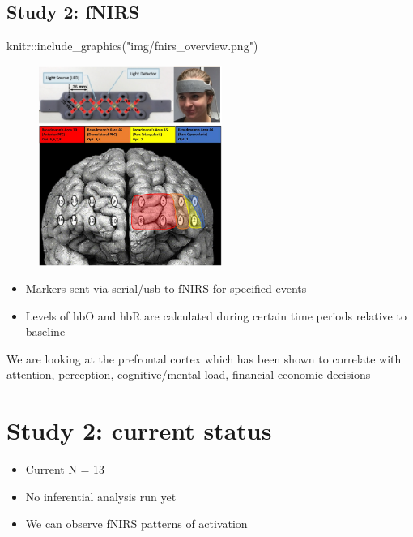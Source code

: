 \documentclass[
  letterpaper,
  DIV=11,
  numbers=noendperiod]{scrartcl}
\newenvironment{Shaded}{\begin{snugshade}}{\end{snugshade}}
\newcommand{\FunctionTok}[1]{\textcolor[rgb]{0.28,0.35,0.67}{#1}}
\newcommand{\NormalTok}[1]{\textcolor[rgb]{0.00,0.23,0.31}{#1}}
\newcommand{\SpecialCharTok}[1]{\textcolor[rgb]{0.37,0.37,0.37}{#1}}
\newcommand{\StringTok}[1]{\textcolor[rgb]{0.13,0.47,0.30}{#1}}
\begin{document}
\hypertarget{study-2-fnirs}{%
\subsection{Study 2: fNIRS}\label{study-2-fnirs}}

\begin{Shaded}
\begin{Highlighting}[]
\NormalTok{knitr}\SpecialCharTok{::}\FunctionTok{include\_graphics}\NormalTok{(}\StringTok{"img/fnirs\_overview.png"}\NormalTok{)}
\end{Highlighting}
\end{Shaded}

\begin{figure}[H]

{\centering \includegraphics[width=2.35in,height=1\textheight]{img/fnirs_overview.png}

}

\end{figure}

\begin{itemize}
\item
  Markers sent via serial/usb to fNIRS for specified events
\item
  Levels of hbO and hbR are calculated during certain time periods
  relative to baseline
\end{itemize}

We are looking at the prefrontal cortex which has been shown to
correlate with attention, perception, cognitive/mental load, financial
economic decisions

\hypertarget{study-2-current-status}{%
\section{Study 2: current status}\label{study-2-current-status}}

\begin{itemize}
\item
  Current N = 13
\item
  No inferential analysis run yet
\item
  We can observe fNIRS patterns of activation
\end{itemize}
\end{document}
